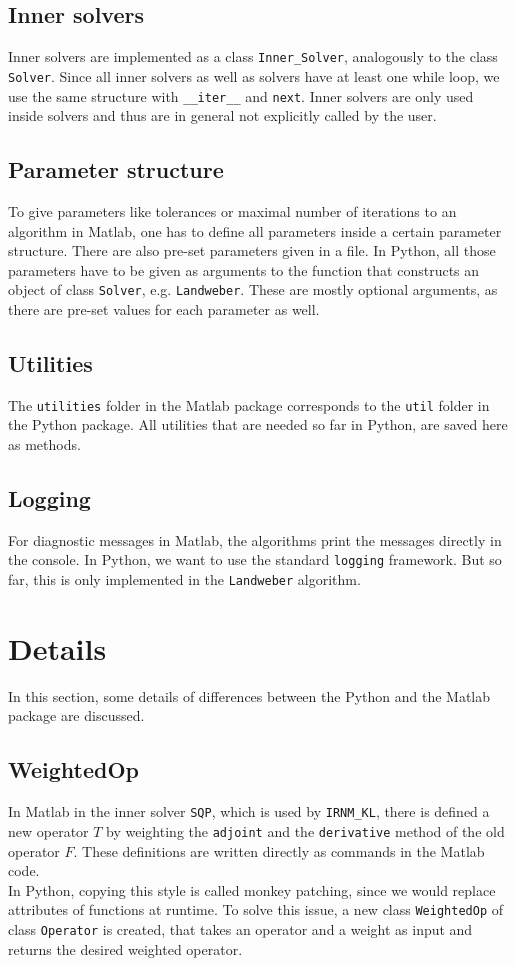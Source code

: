 \documentclass[12pt]{scrartcl}
\begin{document}
\subsection{Inner solvers}
Inner solvers are implemented as a class \texttt{Inner\_Solver}, analogously to the class \texttt{Solver}. Since all inner solvers as well as solvers have  at least one while loop, we use the same structure with \texttt{\_\_iter\_\_} and \texttt{next}. Inner solvers are only used inside solvers and thus are in general not explicitly called by the user.
\subsection{Parameter structure}
To give parameters like tolerances or maximal number of iterations to an algorithm in Matlab, one has to define all parameters inside a certain parameter structure. There are also pre-set parameters given in a file. In Python, all those parameters have to be given as arguments to the function that constructs an object of class \texttt{Solver}, e.g. \texttt{Landweber}. These are mostly optional arguments, as there are pre-set values for each parameter as well.
\subsection{Utilities}
The \texttt{utilities} folder in the Matlab package corresponds to the \texttt{util} folder in the Python package. All utilities that are needed so far in Python, are saved here as methods.
\subsection{Logging}
For diagnostic messages in Matlab, the algorithms print the messages directly in the console. In Python, we want to use the standard \texttt{logging} framework. But so far, this is only implemented in the \texttt{Landweber} algorithm.
\section{Details}
In this section, some details of differences between the Python and the Matlab package are discussed.
\subsection{WeightedOp}
In Matlab in the inner solver \texttt{SQP}, which is used by \texttt{IRNM\_KL}, there is defined a new operator $T$ by weighting the \texttt{adjoint} and the \texttt{derivative} method of the old operator $F$. These definitions are written directly as commands in the Matlab code.\\
In Python, copying this style is called monkey patching, since we would replace attributes of functions at runtime. To solve this issue, a new class \texttt{WeightedOp} of class \texttt{Operator} is created, that takes an operator and a weight as input and returns the desired weighted operator.
\end{document}
